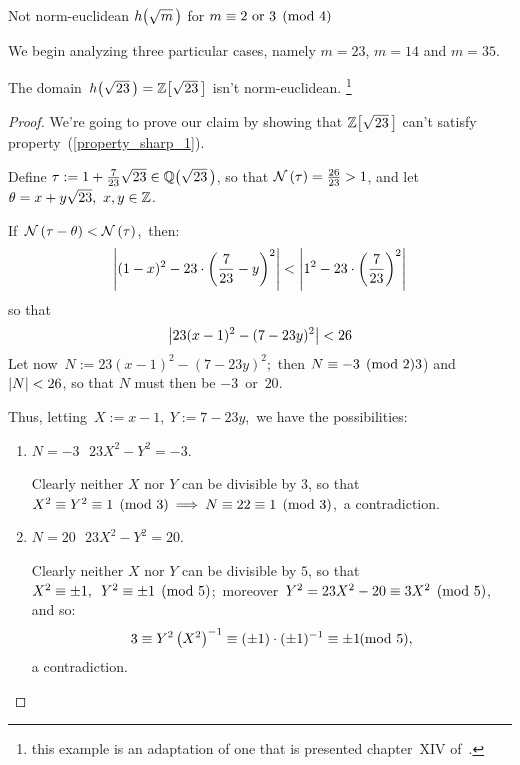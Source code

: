 \smallskip
\begin{subsection}{Not norm-euclidean $\hh{m}$ for %
                   $m \equiv 2 \text{ or } 3 \pmod 4$}

We begin analyzing three particular cases, namely $m = 23$,
$m = 14$ and $m = 35$.

\begin{thm}\label{h(sqrt(23)) not norm-euclidean}
The domain \,$\hh{23} = \ZZ{23}$ isn't norm-euclidean.%
\footnote{this example is an adaptation of one that
is presented chapter~XIV of~\cite{H&W}.}
\end{thm}

\begin{proof}
%
We're going to prove our claim by showing that
$\ZZ{23}$ can't satisfy property~(\ref{property_sharp_1}).

Define $\tau := 1 + \frac{7}{23}\sqrt{23} \in \QQ{23}$,
so that $\mathcal{N}\left(\tau\right) = \frac{26}{23} > 1$, and let
$\theta = x + y \sqrt{23},\ x,y \in \mathbb{Z}$.

If\, $\mathcal{N}\left(\tau - \theta\right) < \mathcal{N}\left(\tau\right)$,\, then:
$$
\left|(1 - x)^2 - 23 \cdot \left(\frac{7}{23} - y\right)^2\right| <
\left|1^2 - 23\cdot\left(\frac{7}{23}\right)^2\right|$$
so that
$$\left|23(x - 1)^2 - (7 - 23y)^2\right| < 26$$
Let now\, $N:= 23(x - 1)^2 - (7 - 23y)^2$;\, then
$N \equiv -3 \pmod 23$) and $\left|N\right| < 26$, so that
$N$ must then be $-3$\, or\, $20$.

Thus, letting\, $X:= x - 1,\: Y:= 7 - 23y$,\, we have the
possibilities:
%
\begin{enumerate}
%
\item
$N = -3$ \,\ie\,$23X^2 - Y^2 = -3$.

Clearly neither $X$ nor $Y$ can be divisible by $3$, so that
$X^2 \equiv Y^2 \equiv 1 \pmod 3
\:\Longrightarrow\: N \equiv 22 \equiv 1 \pmod 3$,
\,a contradiction.
%
\item
$N = 20$ \,\ie\,$23X^2 - Y^2 = 20$.

Clearly neither $X$ nor $Y$ can be divisible by $5$, so that
$X^2 \equiv \pm{1},\,\ Y^2 \equiv \pm{1} \pmod 5$;\,
moreover\, $Y^2 = 23X^2 - 20 \equiv 3X^2 \pmod 5$, and so:
$$
  3 \equiv Y^2\left(X^2\right)^{-1} \equiv
  (\pm{1}) \cdot (\pm{1})^{-1} \equiv \pm{1}\!\!\! \pmod 5,
$$
a contradiction.
%
\end{enumerate}


\end{proof}
\end{subsection}
